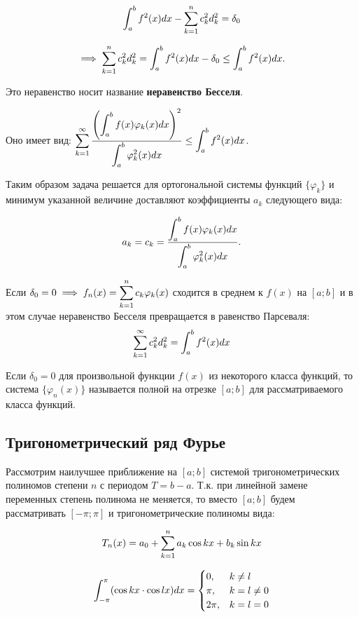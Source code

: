 \begin{definition}
    \[ \displaystyle\int_a^b f^2(x)dx - \displaystyle\sum_{k=1}^n c_k^2d_k^2 = \delta_0 \]

    \[ \implies \displaystyle\sum_{k=1}^n c_k^2d_k^2 = \displaystyle\int_a^b f^2(x)dx - \delta_0 \leq \displaystyle\int_a^bf^2(x)dx. \]

    Это неравенство носит название \textbf{неравенство Бесселя}.

    Оно имеет вид: $\displaystyle\sum_{k=1}^\infty \frac{\left(\displaystyle\int_a^b f(x)\varphi_k(x)dx\right)^2}{\displaystyle\int_a^b \varphi_k^2(x)dx} \leq \displaystyle\int_a^b f^2(x) dx$.

    Таким образом задача решается для ортогональной системы функций $\{ \varphi_k \}$
    и минимум указанной величине доставляют коэффициенты $a_k$  следующего вида:

    \[ a_k = c_k = \frac{\displaystyle\int_a^b f(x) \varphi_k(x)dx}{\displaystyle\int_a^b \varphi_k^2(x) dx}. \]

    Если $\delta_0 = 0 \implies f_n(x) = \displaystyle\sum_{k=1}^n c_k\varphi_k(x)$ сходится
    в среднем к $f(x)$ на $[a ; b]$ и в этом случае неравенство Бесселя
    превращается в равенство Парсеваля: 
    \[ \displaystyle\sum_{k=1}^\infty c_k^2 d_k^2 = \displaystyle\int_a^b f^2(x)dx \]
    
\end{definition}


\begin{definition}
    Если $\delta_0 = 0$ для произвольной функции $f(x)$ из некоторого класса функций,
    то система $\{ \varphi_n(x) \}$ называется полной на отрезке $[a ; b]$ для
    рассматриваемого класса функций.
\end{definition}


\subsection{Тригонометрический ряд Фурье}

Рассмотрим наилучшее приближение на $[a ; b]$ системой тригонометрических полиномов
степени $n$ с периодом $T=b-a$. Т.к. при линейной замене переменных степень полинома
не меняется, то вместо $[a ; b]$ будем рассматривать $[-\pi ; \pi]$ и тригонометрические
полиномы вида:

\[T_n(x) = a_0 + \displaystyle\sum_{k=1}^n a_k \cos kx + b_k \sin kx \]

\[\displaystyle\int_{-\pi}^\pi (\cos kx \cdot \cos lx) dx =
 \begin{cases}
    0, &k \neq l \\
    \pi, &k = l \neq 0 \\
    2\pi, &k = l = 0   
  \end{cases}
\]

